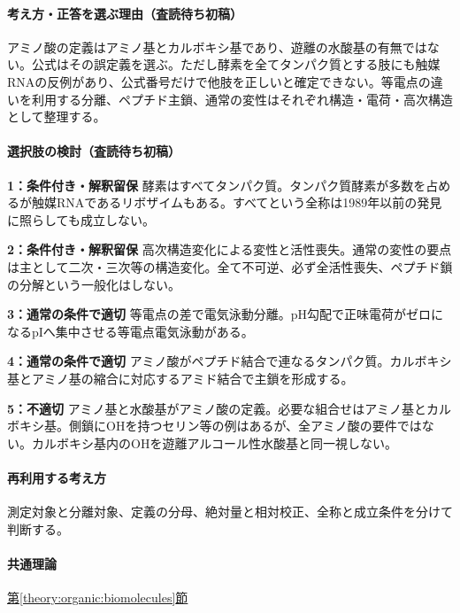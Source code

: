 \paragraph{考え方・正答を選ぶ理由（査読待ち初稿）} アミノ酸の定義はアミノ基とカルボキシ基であり、遊離の水酸基の有無ではない。公式はその誤定義を選ぶ。ただし酵素を全てタンパク質とする肢にも触媒RNAの反例があり、公式番号だけで他肢を正しいと確定できない。等電点の違いを利用する分離、ペプチド主鎖、通常の変性はそれぞれ構造・電荷・高次構造として整理する。

\paragraph{選択肢の検討（査読待ち初稿）}\mbox{}\par

\noindent\textbf{1：条件付き・解釈留保} 酵素はすべてタンパク質。タンパク質酵素が多数を占めるが触媒RNAであるリボザイムもある。すべてという全称は1989年以前の発見に照らしても成立しない。\par

\noindent\textbf{2：条件付き・解釈留保} 高次構造変化による変性と活性喪失。通常の変性の要点は主として二次・三次等の構造変化。全て不可逆、必ず全活性喪失、ペプチド鎖の分解という一般化はしない。\par

\noindent\textbf{3：通常の条件で適切} 等電点の差で電気泳動分離。pH勾配で正味電荷がゼロになるpIへ集中させる等電点電気泳動がある。\par

\noindent\textbf{4：通常の条件で適切} アミノ酸がペプチド結合で連なるタンパク質。カルボキシ基とアミノ基の縮合に対応するアミド結合で主鎖を形成する。\par

\noindent\textbf{5：不適切} アミノ基と水酸基がアミノ酸の定義。必要な組合せはアミノ基とカルボキシ基。側鎖にOHを持つセリン等の例はあるが、全アミノ酸の要件ではない。カルボキシ基内のOHを遊離アルコール性水酸基と同一視しない。\par

\paragraph{再利用する考え方} 測定対象と分離対象、定義の分母、絶対量と相対校正、全称と成立条件を分けて判断する。

\paragraph{共通理論} \hyperref[theory:organic:biomolecules]{第\ref*{theory:organic:biomolecules}節}

